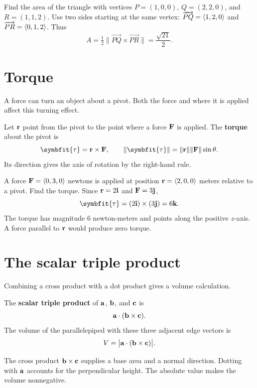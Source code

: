 \documentclass[11pt]{article}
\begin{document}
\begin{example}{Find the area of the triangle with vertices
$P=(1,0,0)$, $Q=(2,2,0)$, and $R=(1,1,2)$.}
Use two sides starting at the same vertex:
$\overrightarrow{PQ}=\left\langle 1,2,0\right\rangle$ and $\overrightarrow{PR}=\left\langle 0,1,2\right\rangle$. Thus
\[
 A=\tfrac12\lVert\vec{PQ}\times\vec{PR}\rVert=\frac{\sqrt{21}}2.
\]
\end{example}

\newpage
\section{Torque}
A force can turn an object about a pivot. Both the force and where it is
applied affect this turning effect.

\begin{definition}[Torque]
Let $\mathbf{r}$ point from the pivot to the point where a force $\mathbf{F}$ is applied.
The \textbf{torque} about the pivot is
\[
 \symbfit{\tau}=\B{r}\times\B{F},\qquad
 \lVert\symbfit{\tau}\rVert
 =\lVert\B{r}\rVert\lVert\B{F}\rVert\sin\theta.
\]
Its direction gives the axis of rotation by the right-hand rule.
\end{definition}

\begin{example}{A force $\mathbf{F}=\left\langle 0,3,0\right\rangle$ newtons is applied at position
$\mathbf{r}=\left\langle 2,0,0\right\rangle$ meters relative to a pivot. Find the torque.}
Since $\mathbf{r}=2\mathbf{i}$ and $\mathbf{F}=3\mathbf{j}$,
\[
 \symbfit{\tau}=(2\B{i})\times(3\B{j})=6\B{k}.
\]
The torque has magnitude $6$ newton-meters and points along the positive
$z$-axis. A force parallel to $\mathbf{r}$ would produce zero torque.
\end{example}

\section{The scalar triple product}
Combining a cross product with a dot product gives a volume calculation.

\begin{definition}
The \textbf{scalar triple product} of $\mathbf{a}$, $\mathbf{b}$, and $\mathbf{c}$ is
\[
 \mathbf{a}\cdot(\mathbf{b}\times\mathbf{c}).
\]
The volume of the parallelepiped with these three adjacent edge vectors is
\[
 V=\bigl|\mathbf{a}\cdot(\mathbf{b}\times\mathbf{c})\bigr|.
\]
\end{definition}

The cross product $\mathbf{b}\times\mathbf{c}$ supplies a base area and a normal
direction. Dotting with $\mathbf{a}$ accounts for the perpendicular height.
The absolute value makes the volume nonnegative.
\end{document}
